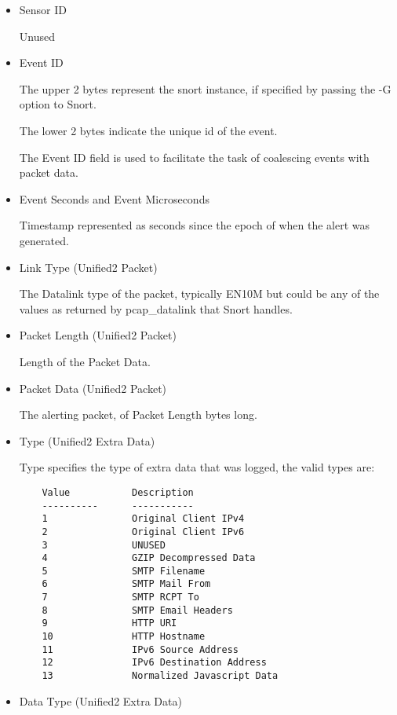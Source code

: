 \documentclass[english]{report}
\begin{document}
\begin{itemize}\itemsep2pt
\item Sensor ID 

Unused 

\item Event ID

The upper 2 bytes represent the snort instance, if specified by passing the -G option to Snort.

The lower 2 bytes indicate the unique id of the event.

The Event ID field is used to facilitate the task of coalescing
events with packet data.

\item Event Seconds and Event Microseconds

Timestamp represented as seconds since the epoch of when the alert was generated.

\item Link Type (Unified2 Packet)

The Datalink type of the packet, typically EN10M but could be any of the values as returned by pcap\_datalink that Snort handles.
   
\item Packet Length (Unified2 Packet) 

Length of the Packet Data.
 
\item Packet Data (Unified2 Packet)

The alerting packet, of Packet Length bytes long.

\item Type (Unified2 Extra Data)

Type specifies the type of extra data that was logged, the valid types are:

\begin{verbatim}
    Value           Description 
    ----------      -----------
    1               Original Client IPv4 
    2               Original Client IPv6
    3               UNUSED
    4               GZIP Decompressed Data
    5               SMTP Filename
    6               SMTP Mail From
    7               SMTP RCPT To
    8               SMTP Email Headers
    9               HTTP URI
    10              HTTP Hostname
    11              IPv6 Source Address
    12              IPv6 Destination Address
    13              Normalized Javascript Data
\end{verbatim}
    
\item Data Type (Unified2 Extra Data)


\end{itemize}
\end{document}

